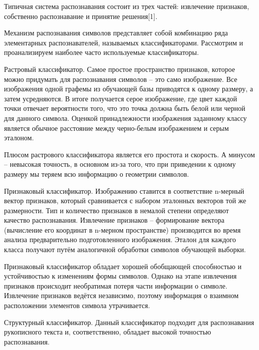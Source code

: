 \documentclass[14pt,a4paper]{extreport}
\begin{document}
 \hspace{4ex} Типичная система распознавания состоит из трех частей: извлечение признаков, собственно распознавание и принятие решения[1].\
 
\hspace{4ex} Механизм распознавания символов представляет собой комбинацию ряда элементарных распознавателей, называемых классификаторами. Рассмотрим и проанализируем наиболее часто используемые классификаторы.\
      
\hspace{4ex} Растровый классификатор. Самое простое пространство признаков, которое можно придумать для распознавания символов – это само изображение. Все изображения одной графемы из обучающей базы приводятся к одному размеру, а затем усредняются. В итоге получается серое изображение, где цвет каждой точки отвечает вероятности того, что это точка должна быть белой или черной для данного символа. Оценкой принадлежности изображения заданному классу является обычное расстояние между черно-белым изображением и серым эталоном.\

\hspace{4ex} Плюсом растрового классификатора является его простота и скорость. А минусом – невысокая точность, в основном из-за того, что при приведении к одному размеру мы теряем всю информацию о геометрии символов.\

\hspace{4ex} Признаковый классификатор. Изображению ставится в соответствие n-мерный вектор признаков, который сравнивается с набором эталонных векторов той же размерности. Тип и количество признаков в немалой степени определяют качество распознавания. Извлечение признаков – формирование вектора (вычисление его координат в n-мерном пространстве) производится во время анализа предварительно подготовленного изображения. Эталон для каждого класса получают путём аналогичной обработки символов обучающей выборки.\

\hspace{4ex} Признаковый классификатор обладает хорошей обобщающей способностью и устойчивостью к изменениям формы символов. Однако на этапе извлечения признаков происходит необратимая потеря части информации о символе. Извлечение признаков ведётся независимо, поэтому информация о взаимном расположении элементов символа утрачивается.\

\hspace{4ex} Структурный классификатор. Данный классификатор подходит для распознавания рукописного текста и, соответственно, обладает высокой точностью распознавания.\
\end{document}
